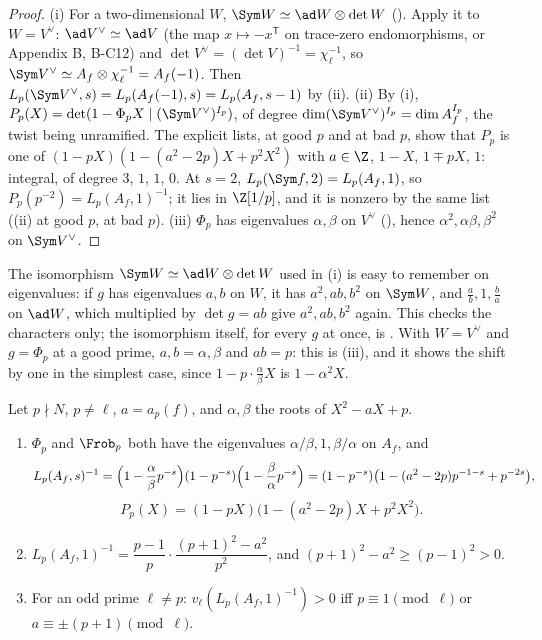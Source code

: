 \begin{proof}
(i) For a two-dimensional $W$, $\Sym W\simeq\ad W\otimes\det W$ (). Apply it to $W=V^\vee$: $\ad V^\vee\simeq\ad V$ (the map $x\mapsto-x^{\mathsf T}$ on
trace-zero endomorphisms, or Appendix B, B-C12) and $\det V^\vee=(\det V)^{-1}=\chi_\ell^{-1}$, so $\Sym V^\vee\simeq A_f\otimes\chi_\ell^{-1}=A_f(-1)$. Then
$L_p(\Sym V^\vee,s)=L_p(A_f(-1),s)=L_p(A_f,s-1)$ by (ii). (ii) By (i), $P_p(X)=\det(1-\Phi_pX\mid(\Sym V^\vee)^{I_p})$, of degree
$\dim(\Sym V^\vee)^{I_p}=\dim A_f^{I_p}$, the twist being unramified. The explicit lists,  at good $p$ and  at bad
$p$, show that $P_p$ is one of $(1-pX)(1-(a^2-2p)X+p^2X^2)$ with $a\in\Z$, $1-X$, $1\mp pX$, $1$: integral, of degree $3$, $1$, $1$, $0$. At $s=2$,
$L_p(\Sym f,2)=L_p(A_f,1)$, so $P_p(p^{-2})=L_p(A_f,1)^{-1}$; it lies in $\Z[1/p]$, and it is nonzero by the same list ((ii) at good $p$,  at bad $p$). (iii) $\Phi_p$ has
eigenvalues $\alpha,\beta$ on $V^\vee$ (), hence $\alpha^2,\alpha\beta,\beta^2$ on $\Sym V^\vee$.
\end{proof}

The isomorphism $\Sym W\simeq\ad W\otimes\det W$ used in (i) is easy to remember on eigenvalues: if $g$ has eigenvalues $a,b$ on $W$, it has $a^2,ab,b^2$ on $\Sym W$, and
$\frac ab,1,\frac ba$ on $\ad W$, which multiplied by $\det g=ab$ give $a^2,ab,b^2$ again. This checks the characters only; the isomorphism itself, for every $g$ at once, is
. With $W=V^\vee$ and $g=\Phi_p$ at a good prime, $a,b=\alpha,\beta$ and $ab=p$: this is (iii), and it shows the shift by one in the simplest case, since
$1-p\cdot\frac\alpha\beta X$ is $1-\alpha^2X$.

\begin{proposition}\label{prop:lfunctions:good-factor}
Let $p\nmid N$, $p\ne\ell$, $a=a_p(f)$, and $\alpha,\beta$ the roots of $X^2-aX+p$.
\begin{enumerate}[label=(\roman*)]
\item $\Phi_p$ and $\Frob_p$ both have the eigenvalues $\alpha/\beta,1,\beta/\alpha$ on $A_f$, and
\[
L_p(A_f,s)^{-1}=\Bigl(1-\frac\alpha\beta p^{-s}\Bigr)(1-p^{-s})\Bigl(1-\frac\beta\alpha p^{-s}\Bigr)=(1-p^{-s})\bigl(1-(a^2-2p)p^{-1-s}+p^{-2s}\bigr),
\]
\[
P_p(X)=(1-pX)\bigl(1-(a^2-2p)X+p^2X^2\bigr).
\]
\item $L_p(A_f,1)^{-1}=\dfrac{p-1}p\cdot\dfrac{(p+1)^2-a^2}{p^2}$, and $(p+1)^2-a^2\ge(p-1)^2>0$.
\item For an odd prime $\ell\ne p$: $v_\ell(L_p(A_f,1)^{-1})>0$ iff $p\equiv1\pmod\ell$ or $a\equiv\pm(p+1)\pmod\ell$.
\end{enumerate}
\end{proposition}

